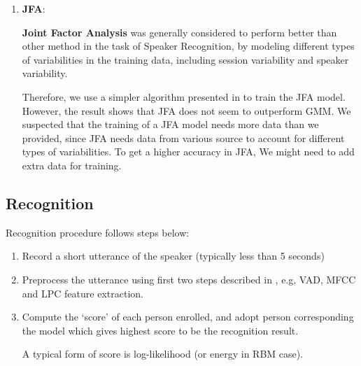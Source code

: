 \begin{enumerate}
		\item \textbf{JFA}:

          \textbf{Joint Factor Analysis} \cite{jfa2,jfa-se} was generally considered to perform better than other method
          in the task of Speaker Recognition, by modeling different types of variabilities in the training data, including session variability and
          speaker variability.

          Therefore, we use a simpler algorithm presented in \cite{jfa-study} to train the JFA model.
          However, the result shows that JFA does not seem to outperform GMM.
          We suspected that the training of a JFA model needs more data than
          we provided, since JFA needs data from various source to account for different types of variabilities.
          To get a higher accuracy in JFA, We might need to add extra data for training.
	\end{enumerate}

\subsection{Recognition}
	Recognition procedure follows steps below:
	\begin{enumerate}
		\item Record a short utterance of the speaker (typically less than 5 seconds)

		\item Preprocess the utterance using first two steps described in
			, e.g, VAD, MFCC and LPC feature extraction.

		\item Compute the `score' of each person enrolled, and adopt person
			corresponding the model which gives highest score to be the
			recognition result.

			A typical form of score is log-likelihood (or energy in RBM case).
	\end{enumerate}
